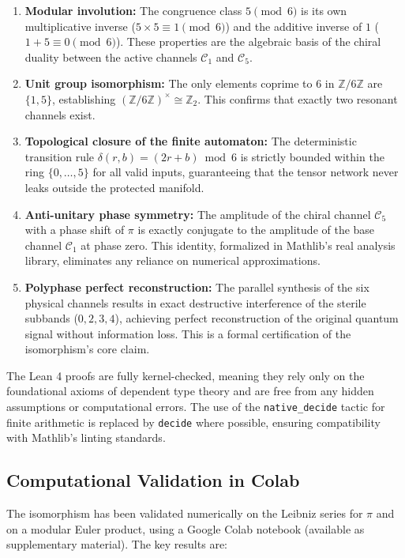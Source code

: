 \documentclass{article}
\theoremstyle{plain}
\theoremstyle{definition}
\theoremstyle{remark}
\begin{document}
\begin{enumerate}
    \item \textbf{Modular involution:} The congruence class \(5 \pmod{6}\) is its own multiplicative inverse (\(5 \times 5 \equiv 1 \pmod{6}\)) and the additive inverse of \(1\) (\(1 + 5 \equiv 0 \pmod{6}\)). These properties are the algebraic basis of the chiral duality between the active channels \(\mathcal{C}_1\) and \(\mathcal{C}_5\).
    \item \textbf{Unit group isomorphism:} The only elements coprime to \(6\) in \(\mathbb{Z}/6\mathbb{Z}\) are \(\{1,5\}\), establishing \((\mathbb{Z}/6\mathbb{Z})^{\times} \cong \mathbb{Z}_2\). This confirms that exactly two resonant channels exist.
    \item \textbf{Topological closure of the finite automaton:} The deterministic transition rule \(\delta(r, b) = (2r + b) \bmod 6\) is strictly bounded within the ring \(\{0, \dots, 5\}\) for all valid inputs, guaranteeing that the tensor network never leaks outside the protected manifold.
    \item \textbf{Anti-unitary phase symmetry:} The amplitude of the chiral channel \(\mathcal{C}_5\) with a phase shift of \(\pi\) is exactly conjugate to the amplitude of the base channel \(\mathcal{C}_1\) at phase zero. This identity, formalized in Mathlib's real analysis library, eliminates any reliance on numerical approximations.
    \item \textbf{Polyphase perfect reconstruction:} The parallel synthesis of the six physical channels results in exact destructive interference of the sterile subbands (\(0,2,3,4\)), achieving perfect reconstruction of the original quantum signal without information loss. This is a formal certification of the isomorphism's core claim.
\end{enumerate}

The Lean 4 proofs are fully kernel-checked, meaning they rely only on the foundational axioms of dependent type theory and are free from any hidden assumptions or computational errors. The use of the \texttt{native\_decide} tactic for finite arithmetic is replaced by \texttt{decide} where possible, ensuring compatibility with Mathlib's linting standards.

\subsection{Computational Validation in Colab}
\label{sec:colab}

The isomorphism has been validated numerically on the Leibniz series for \(\pi\) and on a modular Euler product, using a Google Colab notebook (available as supplementary material). The key results are:
\end{document}
